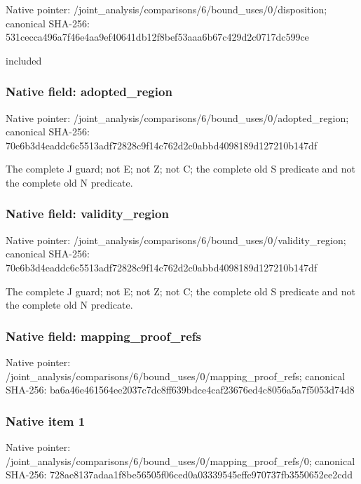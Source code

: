 \documentclass[10pt,a4paper]{article}
\begin{document}
Native pointer: /joint\_analysis/comparis\allowbreak{}ons/6/bound\_uses/0/dispo\allowbreak{}sition; canonical SHA-256: 531cecca496a7f46e4aa9ef4\allowbreak{}0641db12f8bef53aaa6b67c4\allowbreak{}29d2c0717dc599ce


included


\subsubsection{Native field: adopted\_region}


Native pointer: /joint\_analysis/comparis\allowbreak{}ons/6/bound\_uses/0/adopt\allowbreak{}ed\_region; canonical SHA-256: 70e6b3d4eaddc6c5513adf72\allowbreak{}828c9f14c762d2c0abbd4098\allowbreak{}189d127210b147df


The complete J guard; not E; not Z; not C; the complete old S predicate and not the complete old N predicate.


\subsubsection{Native field: validity\_region}


Native pointer: /joint\_analysis/comparis\allowbreak{}ons/6/bound\_uses/0/valid\allowbreak{}ity\_region; canonical SHA-256: 70e6b3d4eaddc6c5513adf72\allowbreak{}828c9f14c762d2c0abbd4098\allowbreak{}189d127210b147df


The complete J guard; not E; not Z; not C; the complete old S predicate and not the complete old N predicate.


\subsubsection{Native field: mapping\_proof\_refs}


Native pointer: /joint\_analysis/comparis\allowbreak{}ons/6/bound\_uses/0/mappi\allowbreak{}ng\_proof\_refs; canonical SHA-256: ba6a46e461564ee2037c7dc8\allowbreak{}ff639bdce4caf23676ed4c80\allowbreak{}56a5a7f5053d74d8



\subsubsection{Native item 1}


Native pointer: /joint\_analysis/comparis\allowbreak{}ons/6/bound\_uses/0/mappi\allowbreak{}ng\_proof\_refs/0; canonical SHA-256: 728ae8137adaa1f8be56505f\allowbreak{}06ced0a03339545effe97073\allowbreak{}7fb3550652ee2cdd
\end{document}
